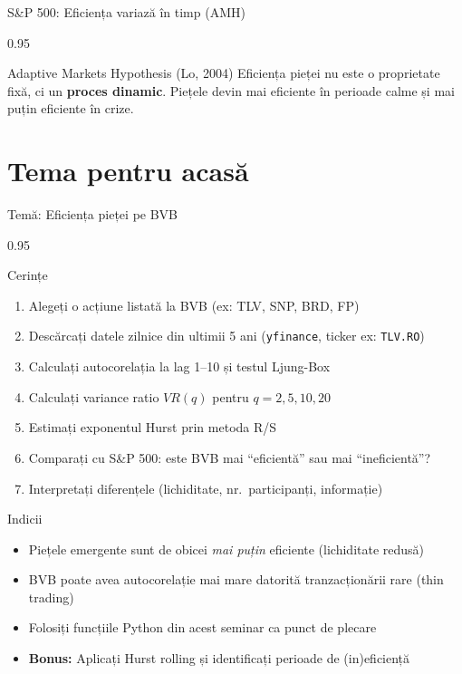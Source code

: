 \documentclass[9pt, aspectratio=169, t]{beamer}
\begin{document}
\begin{frame}{S\&P 500: Eficiența variază în timp (AMH)}
\begin{cminipage}{0.95\textwidth}
\vspace{0.2cm}
\begin{alertblock}{Adaptive Markets Hypothesis (Lo, 2004)}
    {\small Eficiența pieței nu este o proprietate fixă, ci un \textbf{proces dinamic}. Piețele devin mai eficiente în perioade calme și mai puțin eficiente în crize.}
\end{alertblock}
    \end{cminipage}
\end{frame}

\section{Tema pentru acasă}

\begin{frame}{Temă: Eficiența pieței pe BVB}
    \begin{cminipage}{0.95\textwidth}
\begin{block}{Cerințe}
\begin{enumerate}\setlength{\itemsep}{0pt}
    \item Alegeți o acțiune listată la BVB (ex: TLV, SNP, BRD, FP)
    \item Descărcați datele zilnice din ultimii 5 ani (\texttt{yfinance}, ticker ex: \texttt{TLV.RO})
    \item Calculați autocorelația la lag 1--10 și testul Ljung-Box
    \item Calculați variance ratio $VR(q)$ pentru $q = 2, 5, 10, 20$
    \item Estimați exponentul Hurst prin metoda R/S
    \item Comparați cu S\&P 500: este BVB mai ``eficientă'' sau mai ``ineficientă''?
    \item Interpretați diferențele (lichiditate, nr.\ participanți, informație)
\end{enumerate}
\end{block}

\vspace{0.1cm}
\begin{exampleblock}{Indicii}
\begin{itemize}\setlength{\itemsep}{0pt}
    \item Piețele emergente sunt de obicei \textit{mai puțin} eficiente (lichiditate redusă)
    \item BVB poate avea autocorelație mai mare datorită tranzacționării rare (thin trading)
    \item Folosiți funcțiile Python din acest seminar ca punct de plecare
    \item \textbf{Bonus:} Aplicați Hurst rolling și identificați perioade de (in)eficiență
\end{itemize}
\end{exampleblock}
    \end{cminipage}
\end{frame}
\end{document}
